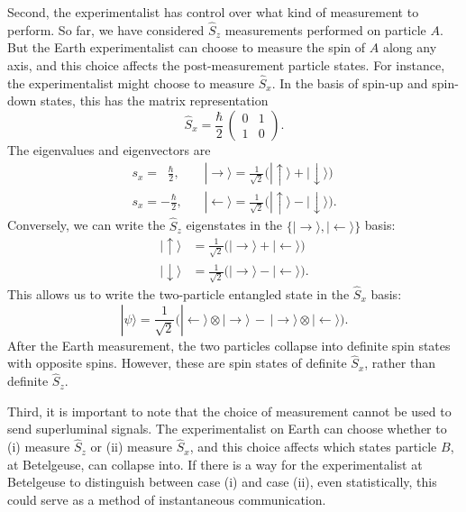 \documentclass[pra,11pt]{revtex4}
\begin{document}
Second, the experimentalist has control over what kind of measurement
to perform.  So far, we have considered $\hat{S}_z$ measurements
performed on particle $A$.  But the Earth experimentalist can choose
to measure the spin of $A$ along any axis, and this choice affects the
post-measurement particle states.  For instance, the experimentalist
might choose to measure $\hat{S}_x$.  In the basis of spin-up and
spin-down states, this has the matrix representation
$$\hat{S}_x = \frac{\hbar}{2}\, \begin{pmatrix}0&1\\1&0\end{pmatrix}.$$
The eigenvalues and eigenvectors are
$$\begin{aligned}s_x = \;\;\frac{\hbar}{2},\; &\;\;\; |\!\rightarrow\rangle = \frac{1}{\sqrt{2}}\Big(|\!\uparrow\rangle + |\!\downarrow\rangle\Big) \\ s_x = -\frac{\hbar}{2}, &\;\;\; |\!\leftarrow\rangle = \frac{1}{\sqrt{2}}\Big(|\!\uparrow\rangle - |\!\downarrow\rangle\Big).\end{aligned}$$
Conversely, we can write the $\hat{S}_z$ eigenstates in the $\{|\!\rightarrow\rangle,|\!\leftarrow\rangle\}$ basis:
$$\begin{aligned}|\!\uparrow\rangle &= \frac{1}{\sqrt{2}}\Big(|\!\rightarrow\rangle + |\!\leftarrow\rangle\Big) \\ |\!\downarrow\rangle &= \frac{1}{\sqrt{2}}\Big(|\!\rightarrow\rangle - |\!\leftarrow\rangle\Big).\end{aligned}$$
This allows us to write the two-particle entangled state in the
$\hat{S}_x$ basis:
$$|\psi\rangle = \frac{1}{\sqrt{2}} \Big(|\!\leftarrow\rangle\otimes|\!\rightarrow\rangle \,-\, |\!\rightarrow\rangle\otimes|\!\leftarrow\rangle\Big).$$
After the Earth measurement, the two particles collapse into definite
spin states with opposite spins.  However, these are spin states of
definite $\hat{S}_x$, rather than definite $\hat{S}_z$.

Third, it is important to note that the choice of measurement cannot
be used to send superluminal signals.  The experimentalist on Earth
can choose whether to (i) measure $\hat{S}_z$ or (ii) measure
$\hat{S}_x$, and this choice affects which states particle $B$, at
Betelgeuse, can collapse into.  If there is a way for the
experimentalist at Betelgeuse to distinguish between case (i) and case
(ii), even statistically, this could serve as a method of
instantaneous communication.
\end{document}

